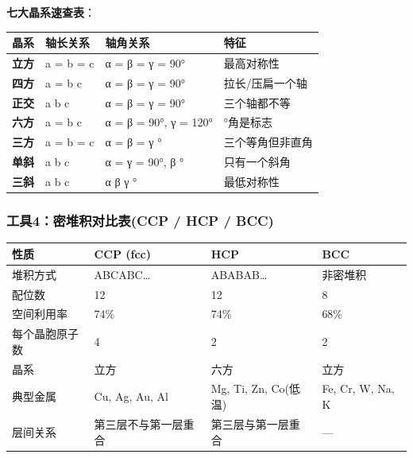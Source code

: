 \textbf{七大晶系速查表}：

{\def\LTcaptype{none} %
\begin{longtable}[]{@{}
  >{\raggedright\arraybackslash}p{}
  >{\raggedright\arraybackslash}p{}
  >{\raggedright\arraybackslash}p{}
  >{\raggedright\arraybackslash}p{}@{}}
\toprule\noalign{}
\begin{minipage}[b]{\linewidth}\raggedright
晶系
\end{minipage} & \begin{minipage}[b]{\linewidth}\raggedright
轴长关系
\end{minipage} & \begin{minipage}[b]{\linewidth}\raggedright
轴角关系
\end{minipage} & \begin{minipage}[b]{\linewidth}\raggedright
特征
\end{minipage} \\
\midrule\noalign{}
\endhead
\bottomrule\noalign{}
\endlastfoot
\textbf{立方} & a = b = c & α = β = γ = 90° & 最高对称性 \\
\textbf{四方} & a = b  c & α = β = γ = 90° & 拉长/压扁一个轴 \\
\textbf{正交} & a  b  c & α = β = γ = 90° & 三个轴都不等 \\
\textbf{六方} & a = b  c & α = β = 90°, γ = 120° & 120°角是标志 \\
\textbf{三方} & a = b = c & α = β = γ  90° & 三个等角但非直角 \\
\textbf{单斜} & a  b  c & α = γ = 90°, β  90° & 只有一个斜角 \\
\textbf{三斜} & a  b  c & α  β  γ  90° & 最低对称性 \\
\end{longtable}
}

\subsubsection{工具4：密堆积对比表(CCP / HCP / BCC)}\label{ux5de5ux51774ux5bc6ux5806ux79efux5bf9ux6bd4ux8868ccp-hcp-bcc}

{\def\LTcaptype{none} %
\begin{longtable}[]{@{}llll@{}}
\toprule\noalign{}
性质 & CCP (fcc) & HCP & BCC \\
\midrule\noalign{}
\endhead
\bottomrule\noalign{}
\endlastfoot
堆积方式 & ABCABC\ldots{} & ABABAB\ldots{} & 非密堆积 \\
配位数 & 12 & 12 & 8 \\
空间利用率 & 74\% & 74\% & 68\% \\
每个晶胞原子数 & 4 & 2 & 2 \\
晶系 & 立方 & 六方 & 立方 \\
典型金属 & Cu, Ag, Au, Al & Mg, Ti, Zn, Co(低温) & Fe, Cr, W, Na, K \\
层间关系 & 第三层不与第一层重合 & 第三层与第一层重合 & --- \\
\end{longtable}
}

